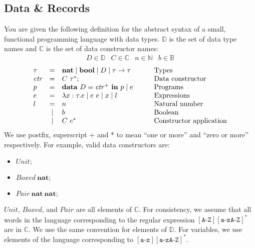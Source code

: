 \documentclass[10pt,a4paper]{exam} %
\begin{document}
\begin{questions}
\section*{Data \& Records}
\question You are given the following definition for the abstract syntax of a small, functional programming language with data types. $\mathbb{D}$ is the set of data type names and $\mathbb{C}$ is the set of data constructor names:
\begin{displaymath}
\begin{array}{cccc}
D \in \mathbb{D} &
C \in \mathbb{C} &
n \in \mathbb{N} &
b \in \mathbb{B} 
\end{array}
\end{displaymath}
\begin{displaymath}
\begin{array}{lcll}
\tau & = & \mathbf{nat} \mid \mathbf{bool} \mid D \mid \tau \to \tau & \qquad \text{\color{black}Types}\\
\mathit{ctr} & = & C~\tau^*; & \qquad \text{\color{black}Data constructor}\\
p & = & \mathbf{data}~D = \mathit{ctr}^+~\mathbf{in}~p \mid e & \qquad \text{\color{black}Programs}\\
e & = & \lambda x : \tau.e \mid e~e \mid x \mid l & \qquad \text{\color{black}Expressions} \\
l & = & n & \qquad \text{Natural number}\\
 & \mid & b & \qquad \text{Boolean} \\
 & \mid & C~e^* & \qquad \text{\color{black}Constructor application}
\end{array}
\end{displaymath}
We use postfix, superscript + and * to mean ``one or more'' and ``zero or more'' respectively. For example, valid data constructors are:
\begin{itemize}
    \item $\mathit{Unit};$
    \item $\mathit{Boxed}~\mathbf{nat};$
    \item $\mathit{Pair}~\mathbf{nat}~\mathbf{nat};$
\end{itemize}
$\mathit{Unit}$, $\mathit{Boxed}$, and $\mathit{Pair}$ are all elements of $\mathbb{C}$. For consistency, we assume that all words in the language corresponding to the regular expression $[\texttt{A-Z}][\texttt{a-zA-Z}]^*$ are in $\mathbb{C}$. We use the same convention for elements of $\mathbb{D}$. For variables, we use elements of the language corresponding to $[\texttt{a-z}][\texttt{a-zA-Z}]^*$.


\end{questions}
\end{document}
